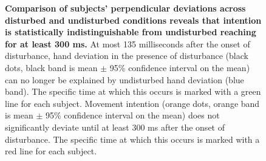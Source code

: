\begin{figure}
\caption{
{\bf Comparison of subjects' perpendicular deviations across disturbed and undisturbed conditions reveals that intention is statistically indistinguishable from undisturbed reaching for at least 300 ms.} At most 135 milliseconds after the onset of disturbance, hand deviation in the presence of disturbance (black dots, black band is mean $\pm$ 95\% confidence interval on the mean) can no longer be explained by undisturbed hand deviation (blue band). The specific time at which this occurs is marked with a green line for each subject. Movement intention (orange dots, orange band is mean $\pm$ 95\% confidence interval on the mean) does not significantly deviate until at least 300 ms after the onset of disturbance. The specific time at which this occurs is marked with a red line for each subject.
}
\label{fig:grouptrends}
\end{figure}
\pagebreak


